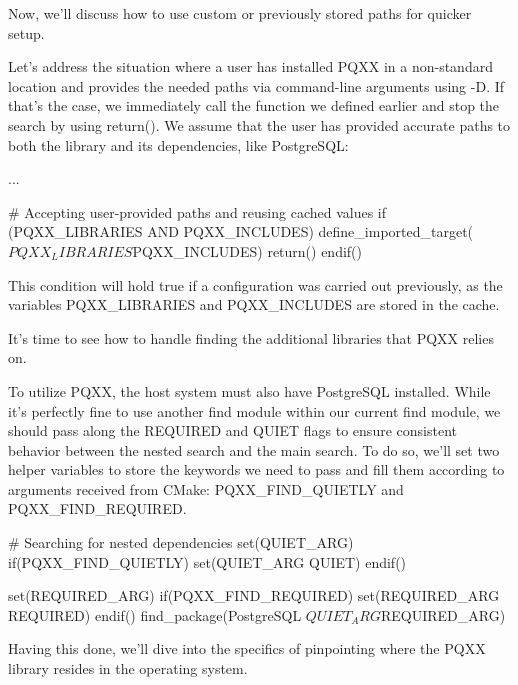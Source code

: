 Now, we’ll discuss how to use custom or previously stored paths for quicker setup.


Let’s address the situation where a user has installed PQXX in a non-standard location and provides the needed paths via command-line arguments using -D. If that’s the case, we immediately call the function we defined earlier and stop the search by using return(). We assume that the user has provided accurate paths to both the library and its dependencies, like PostgreSQL:


\begin{cmake}
...

# Accepting user-provided paths and reusing cached values
if (PQXX_LIBRARIES AND PQXX_INCLUDES)
    define_imported_target(${PQXX_LIBRARIES} ${PQXX_INCLUDES})
    return()
endif()
\end{cmake}

This condition will hold true if a configuration was carried out previously, as the variables PQXX\_LIBRARIES and PQXX\_INCLUDES are stored in the cache.

It’s time to see how to handle finding the additional libraries that PQXX relies on.


To utilize PQXX, the host system must also have PostgreSQL installed. While it’s perfectly fine to use another find module within our current find module, we should pass along the REQUIRED and QUIET flags to ensure consistent behavior between the nested search and the main search. To do so, we’ll set two helper variables to store the keywords we need to pass and fill them according to arguments received from CMake: PQXX\_FIND\_QUIETLY and PQXX\_FIND\_REQUIRED.

\begin{cmake}
# Searching for nested dependencies
set(QUIET_ARG)
if(PQXX_FIND_QUIETLY)
    set(QUIET_ARG QUIET)
endif()

set(REQUIRED_ARG)
if(PQXX_FIND_REQUIRED)
    set(REQUIRED_ARG REQUIRED)
endif()
find_package(PostgreSQL ${QUIET_ARG} ${REQUIRED_ARG})
\end{cmake}

Having this done, we’ll dive into the specifics of pinpointing where the PQXX library resides in the operating system.

